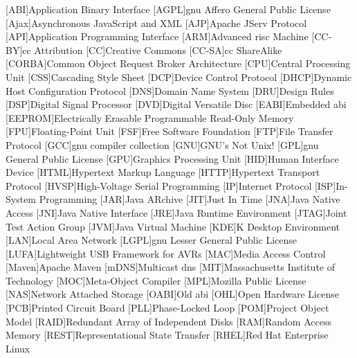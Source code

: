 \begin{acronym}[WYSIWYG]	%
[ABI]{Application Binary Interface}
[AGPL]{\acs{gnu} Affero General Public License}
[Ajax]{Asynchronous JavaScript and XML}
[AJP]{Apache JServ Protocol}
[API]{Application Programming Interface}
[ARM]{Advanced \acs{risc} Machine}
[CC-BY]{\acl{cc} Attribution}
[CC]{Creative Commons}
[CC-SA]{\acl{cc} ShareAlike}
[CORBA]{Common Object Request Broker Architecture}
[CPU]{Central Processing Unit}
[CSS]{Cascading Style Sheet}
[DCP]{Device Control Protocol}
[DHCP]{Dynamic Host Configuration Protocol}
[DNS]{Domain Name System}
[DRU]{Design Rules}
[DSP]{Digital Signal Processor}
[DVD]{Digital Versatile Disc}
[EABI]{Embedded \acs{abi}}
[EEPROM]{Electrically Erasable Programmable Read-Only Memory}
[FPU]{Floating-Point Unit}
[FSF]{Free Software Foundation}
[FTP]{File Transfer Protocol}
[GCC]{\acs{gnu} compiler collection}
[GNU]{GNU's Not Unix!}
[GPL]{\acs{gnu} General Public License}
[GPU]{Graphics Processing Unit}
[HID]{Human Interface Device}
[HTML]{Hypertext Markup Language}
[HTTP]{Hypertext Transport Protocol}
[HVSP]{High-Voltage Serial Programming}
[IP]{Internet Protocol}
[ISP]{In-System Programming}
[JAR]{Java ARchive}
[JIT]{Just In Time}
[JNA]{Java Native Access}
[JNI]{Java Native Interface}
[JRE]{Java Runtime Environment}
[JTAG]{Joint Test Action Group}
[JVM]{Java Virtual Machine}
[KDE]{K Desktop Environment}
[LAN]{Local Area Network}
[LGPL]{\acs{gnu} Lesser General Public License}
[LUFA]{Lightweight USB Framework for AVRs}
[MAC]{Media Access Control}
[Maven]{Apache Maven}
[mDNS]{Multicast \acs{dns}}
[MIT]{Massachusetts Institute of Technology}
[MOC]{Meta-Object Compiler}
[MPL]{Mozilla Public License}
[NAS]{Network Attached Storage}
[OABI]{Old \acs{abi}}
[OHL]{Open Hardware License}
[PCB]{Printed Circuit Board}
[PLL]{Phase-Locked Loop}
[POM]{Project Object Model}
[RAID]{Redundant Array of Independent Disks}
[RAM]{Random Access Memory}
[REST]{Representational State Transfer}
[RHEL]{Red Hat Enterprise Linux}

\end{acronym}
